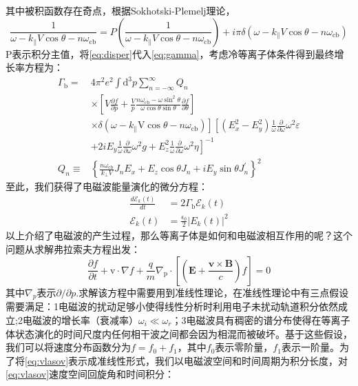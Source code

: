 其中被积函数存在奇点，根据Sokhotski-Plemelj理论\cite{RN1837}，
\begin{equation}
\frac{1}{\omega-k_{\|} V \cos \theta-n \omega_{\mathrm{cb}}}=P\left(\frac{1}{\omega-k_{\|} V \cos \theta-n \omega_{\mathrm{cb}}}\right)+i \pi \delta\left(\omega-k_{\|} V \cos \theta-n \omega_{\mathrm{cb}}\right)
\end{equation}
P表示积分主值，将\autoref{eq:disper}代入\autoref{eq:gamma}，考虑冷等离子体条件得到最终增长率方程为\cite{RN1452}：
\begin{equation}\label{eq:gammab}
\begin{aligned}\Gamma_{\mathrm{b}}= & {4 \pi^{2} e^{2} \int \mathrm{d}^{3} p \sum_{n=-\infty}^{\infty} Q_{n} } \\& \times\left[V \frac{\partial f}{\partial p}+\frac{V}{p} \frac{n \omega_{\mathrm{cb}}-\omega \sin ^{2} \theta}{\omega \cos \theta \sin \theta} \frac{\partial f}{\partial \theta}\right] \\& \left.\times \delta\left(\omega-k_{\|} \mathrm{V} \cos \theta-n \omega_{\mathrm{cb}}\right)\right]\left[\left(E_{x}^{2}-E_{y}^{2}\right) \frac{1}{\omega} \frac{\partial}{\partial \omega} \omega^{2} \varepsilon\right. \\& \left.+2 i E_{y} \frac{1}{\omega} \frac{\partial}{\partial \omega} \omega^{2} g+E_{z}^{2} \frac{1}{\omega} \frac{\partial}{\partial \omega} \omega^{2} \eta\right]^{-1} \\Q_{n} \equiv & \left\{\frac{n \omega_{\mathrm{cb}}}{k_{\perp} V} J_{n} E_{x}+E_{z} \cos \theta J_{n}+i E_{y} \sin \theta J_{n}^{\prime}\right\}^{2}\end{aligned}
\end{equation}
至此，我们获得了电磁波能量演化的微分方程：
\begin{align}
\frac{d \mathcal{E}_{k}(t)}{d t} & = 2 \Gamma_{\mathrm{b}} \mathcal{E}_{k}(t) \\
\mathcal{E}_{k}(t) & = \frac{\epsilon_{0}}{2}\left|E_{k}(t)\right|^{2}
\end{align}
以上介绍了电磁波的产生过程，那么等离子体是如何和电磁波相互作用的呢？这个问题从求解弗拉索夫方程出发：
\begin{equation}\label{eq:vlasov}
\frac{\partial f}{\partial t}+\mathrm{v} \cdot \nabla f+\frac{q}{m} \nabla_{\mathrm{p}} \cdot\left[\left(\mathbf{E}+\frac{\mathbf{v} \times \mathbf{B}}{c}\right) f\right]=0
\end{equation}
其中$∇_p$表示$∂/∂p$.求解该方程中需要用到准线性理论，在准线性理论中有三点假设需要满足：1电磁波的扰动足够小使得线性分析时利用电子未扰动轨道积分依然成立;2电磁波的增长率（衰减率）$ω_i≪ω_r$；3电磁波具有稠密的谱分布使得在等离子体状态演化的时间尺度内任何相干波之间都会因为相混而被破坏。基于这些假设，我们可以将速度分布函数分为$f=f_0+f_1$，其中$f_0$表示零阶量，$f_1$表示一阶量。为了将\autoref{eq:vlasov}表示成准线性形式，我们以电磁波空间和时间周期为积分长度，对\autoref{eq:vlasov}速度空间回旋角和时间积分：
